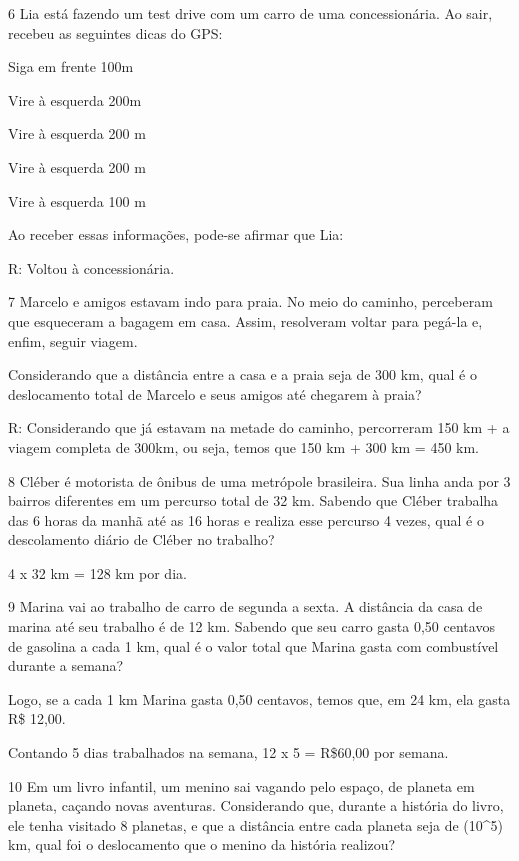 {\num{6} Lia está fazendo um test drive com um carro de uma concessionária. Ao
sair, recebeu as seguintes dicas do GPS:

Siga em frente 100m

Vire à esquerda 200m

Vire à esquerda 200 m

Vire à esquerda 200 m

Vire à esquerda 100 m

Ao receber essas informações, pode-se afirmar que Lia:

R: Voltou à concessionária.

\num{7} Marcelo e amigos estavam indo para praia. No meio do caminho,
perceberam que esqueceram a bagagem em casa. Assim, resolveram voltar
para pegá-la e, enfim, seguir viagem.

Considerando que a distância entre a casa e a praia seja de 300 km, qual
é o deslocamento total de Marcelo e seus amigos até chegarem à praia?

R: Considerando que já estavam na metade do caminho, percorreram 150 km + a
viagem completa de 300km, ou seja, temos que 150 km + 300 km = 450 km.

\num{8} Cléber é motorista de ônibus de uma metrópole brasileira. Sua linha
anda por 3 bairros diferentes em um percurso total de 32 km. Sabendo que
Cléber trabalha das 6 horas da manhã até as 16 horas e realiza esse
percurso 4 vezes, qual é o descolamento diário de Cléber no trabalho?


4 x 32 km = 128 km por dia.

\num{9} Marina vai ao trabalho de carro de segunda a sexta. A distância da
casa de marina até seu trabalho é de 12 km. Sabendo que seu carro gasta
0,50 centavos de gasolina a cada 1 km, qual é o valor total que Marina
gasta com combustível durante a semana?


Logo, se a cada 1 km Marina gasta 0,50 centavos, temos que, em 24 km,
ela gasta R\$ 12,00.

Contando 5 dias trabalhados na semana, 12 x 5 = R\$60,00 por semana.

\num{10} Em um livro infantil, um menino sai vagando pelo espaço, de planeta
em planeta, caçando novas aventuras. Considerando que, durante a
história do livro, ele tenha visitado 8 planetas, e que a distância
entre cada planeta seja de (10^5) km, qual foi o deslocamento que o
menino da história realizou?

}

